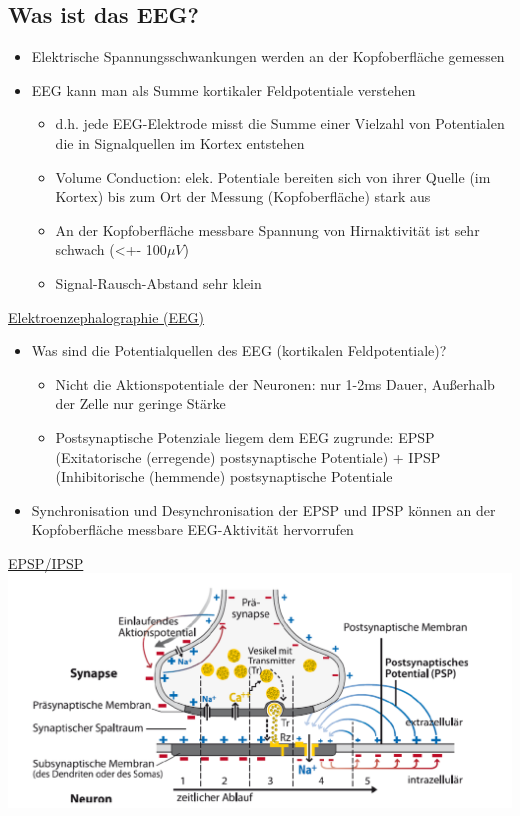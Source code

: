 \documentclass[a4paper,10pt,oneside]{article}
\begin{document}
\subsection{Was ist das EEG?}
	\begin{itemize}
		\item Elektrische Spannungsschwankungen werden an der Kopfoberfläche gemessen
		\item EEG kann man als Summe kortikaler Feldpotentiale verstehen
			\begin{itemize}
				\item d.h. jede EEG-Elektrode misst die Summe einer Vielzahl von Potentialen die in Signalquellen im Kortex entstehen
				\item Volume Conduction: elek. Potentiale bereiten sich von ihrer Quelle (im Kortex) bis zum Ort der Messung (Kopfoberfläche) stark aus
				\item An der Kopfoberfläche messbare Spannung von Hirnaktivität ist sehr schwach (<+- 100$\mu V$)
				\item Signal-Rausch-Abstand sehr klein
			\end{itemize}
	\end{itemize}

\underline{Elektroenzephalographie (EEG)} \\
	\begin{itemize}
		\item Was sind die Potentialquellen des EEG (kortikalen Feldpotentiale)? 
			\begin{itemize}
				\item Nicht die Aktionspotentiale der Neuronen: nur 1-2ms Dauer, Außerhalb der Zelle nur geringe Stärke
				\item Postsynaptische Potenziale liegem dem EEG zugrunde: EPSP (Exitatorische (erregende) postsynaptische Potentiale) + IPSP (Inhibitorische (hemmende) postsynaptische Potentiale
			\end{itemize}
		\item Synchronisation und Desynchronisation der EPSP und IPSP können an der Kopfoberfläche messbare EEG-Aktivität hervorrufen
	\end{itemize}

\underline{EPSP/IPSP} \\
\includegraphics[scale=0.2]{Grafiken/1911.png}
\end{document}
